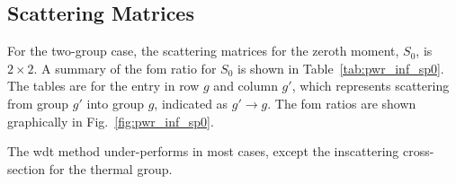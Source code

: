 \subsection{Scattering Matrices}
\label{sec:pwr_inf_total}

For the two-group case, the scattering matrices for the zeroth
moment, $S_0$, is $2 \times 2$. A summary of the \gls{fom} ratio
for $S_0$ is shown in Table~\ref{tab:pwr_inf_sp0}. The
tables are for the entry in row $g$ and column $g'$, which represents
scattering from group $g'$ into group $g$, indicated as $g' \to
g$. The \gls{fom} ratios are shown graphically in Fig.~\ref{fig:pwr_inf_sp0}.

The \gls{wdt} method under-performs in most cases, except the
inscattering cross-section for the thermal group. 

